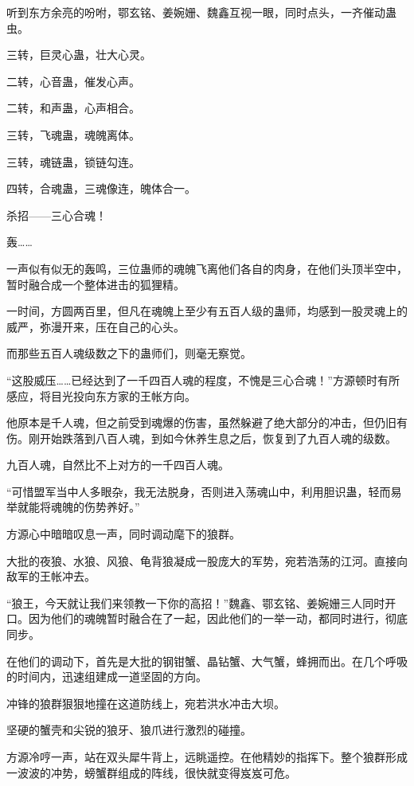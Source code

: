 
\begin{this_body}



听到东方余亮的吩咐，鄂玄铭、姜婉姗、魏鑫互视一眼，同时点头，一齐催动蛊虫。

三转，巨灵心蛊，壮大心灵。

二转，心音蛊，催发心声。

二转，和声蛊，心声相合。

三转，飞魂蛊，魂魄离体。

三转，魂链蛊，锁链勾连。

四转，合魂蛊，三魂像连，魄体合一。

杀招——三心合魂！

轰……

一声似有似无的轰鸣，三位蛊师的魂魄飞离他们各自的肉身，在他们头顶半空中，暂时融合成一个整体进击的狐狸精。

一时间，方圆两百里，但凡在魂魄上至少有五百人级的蛊师，均感到一股灵魂上的威严，弥漫开来，压在自己的心头。

而那些五百人魂级数之下的蛊师们，则毫无察觉。

“这股威压……已经达到了一千四百人魂的程度，不愧是三心合魂！”方源顿时有所感应，将目光投向东方家的王帐方向。

他原本是千人魂，但之前受到魂爆的伤害，虽然躲避了绝大部分的冲击，但仍旧有伤。刚开始跌落到八百人魂，到如今休养生息之后，恢复到了九百人魂的级数。

九百人魂，自然比不上对方的一千四百人魂。

“可惜盟军当中人多眼杂，我无法脱身，否则进入荡魂山中，利用胆识蛊，轻而易举就能将魂魄的伤势养好。”

方源心中暗暗叹息一声，同时调动麾下的狼群。

大批的夜狼、水狼、风狼、龟背狼凝成一股庞大的军势，宛若浩荡的江河。直接向敌军的王帐冲去。

“狼王，今天就让我们来领教一下你的高招！”魏鑫、鄂玄铭、姜婉姗三人同时开口。因为他们的魂魄暂时融合在了一起，因此他们的一举一动，都同时进行，彻底同步。

在他们的调动下，首先是大批的钢钳蟹、晶钻蟹、大气蟹，蜂拥而出。在几个呼吸的时间内，迅速组建成一道坚固的方向。

冲锋的狼群狠狠地撞在这道防线上，宛若洪水冲击大坝。

坚硬的蟹壳和尖锐的狼牙、狼爪进行激烈的碰撞。

方源冷哼一声，站在双头犀牛背上，远眺遥控。在他精妙的指挥下。整个狼群形成一波波的冲势，螃蟹群组成的阵线，很快就变得岌岌可危。


\end{this_body}

